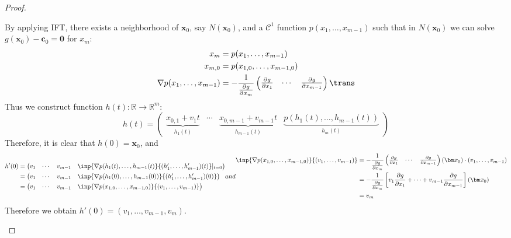 \begin{proof}
\begin{enumerate}
\begin{itemize}
By applying IFT, there exists a neighborhood of $\bm x_0$, say $N(\bm x_0)$, and a $\mathcal{C}^1$ function $p(x_1,\dots,x_{m-1})$ such that in $N(\bm x_0)$ we can solve $g(\bm x_0)-\bm c_0=\bm0$ for $x_m$:
\begin{subequations}
\begin{align}
x_m&=p(x_1,\dots,x_{m-1})\\
x_{m,0}&=p(x_{1,0},\dots,x_{m-1,0})\\
\nabla p(x_1,\dots,x_{m-1})&=-\frac{1}{\frac{\partial g}{\partial x_m}}
\begin{pmatrix}
\frac{\partial g}{\partial x_1}
&
\cdots
&
\frac{\partial g}{\partial x_{m-1}}
\end{pmatrix}\trans\label{Eq:13:12:c}
\end{align}
\end{subequations}
Thus we construct function $h(t):\mathbb{R}\to\mathbb{R}^m$:
\[
h(t)=\begin{pmatrix}
\underbrace{x_{0,1}+v_1t}_{h_1(t)}
&
\cdots
&
\underbrace{x_{0,m-1}+v_{m-1}t}_{h_{m-1}(t)}
&
\underbrace{
p(h_1(t),\dots,h_{m-1}(t))
}_{h_{m}(t)}
\end{pmatrix}
\]
Therefore, it is clear that $h(0)=\bm x_0$, and
\begin{subequations}
\begin{align}
h'(0)&=\begin{pmatrix}
v_1&\cdots&v_{m-1}&\inp{\nabla p(h_1(t),\dots,h_{m-1}(t)}{(h_1',\dots,h_{m-1}')(t)}|_{t=0}\label{Eq:13:13:a}
\end{pmatrix}\\
&=
\begin{pmatrix}
v_1&\cdots&v_{m-1}&\inp{\nabla p(h_1(0),\dots,h_{m-1}(0))}{(h_1',\dots,h_{m-1}')(0)}
\end{pmatrix}\label{Eq:13:13:b}\\
&=\begin{pmatrix}
v_1&\cdots&v_{m-1}&\inp{\nabla p(x_{1,0},\dots,x_{m-1,0})}{(v_1,\dots,v_{m-1})}
\end{pmatrix}\label{Eq:13:13:c}
\end{align}
and
\begin{align}
\inp{\nabla p(x_{1,0},\dots,x_{m-1,0})}{(v_1,\dots,v_{m-1})}&=
-\frac{1}{\frac{\partial g}{\partial x_m}}
\begin{pmatrix}
\frac{\partial g}{\partial x_1}
&
\cdots
&
\frac{\partial g}{\partial x_{m-1}}
\end{pmatrix}(\bm x_0)\cdot(v_1,\dots,v_{m-1})\label{Eq:13:13:d}\\
&=
-\frac{1}{\frac{\partial g}{\partial x_m}}
\left[
v_1\frac{\partial g}{\partial x_1}+\cdots+v_{m-1}\frac{\partial g}{\partial x_{m-1}}
\right](\bm x_0)\label{Eq:13:13:e}\\
&=v_m\label{Eq:13:13:f}
\end{align}
\end{subequations}
Therefore we obtain $h'(0)=(v_1,\dots,v_{m-1},v_m)$.


\end{itemize}
\end{enumerate}
\end{proof}
